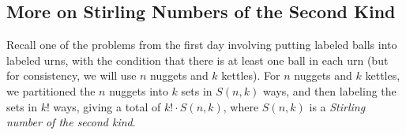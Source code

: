 \label{07-0214}

% 






% 




\subsection{More on Stirling Numbers of the Second Kind}
Recall one of the problems from the first day involving putting labeled balls into labeled urns, with the condition that there is at least one ball in each urn (but for consistency, we will use $n$ nuggets and $k$ kettles). For $n$ nuggets and $k$ kettles, we partitioned the $n$ nuggets into $k$ sets in $S(n, k)$ ways, and then labeling the sets in $k!$ ways, giving a total of $k! \cdot S(n, k)$, where $S(n, k)$ is a \textit{Stirling number of the second kind}. 

